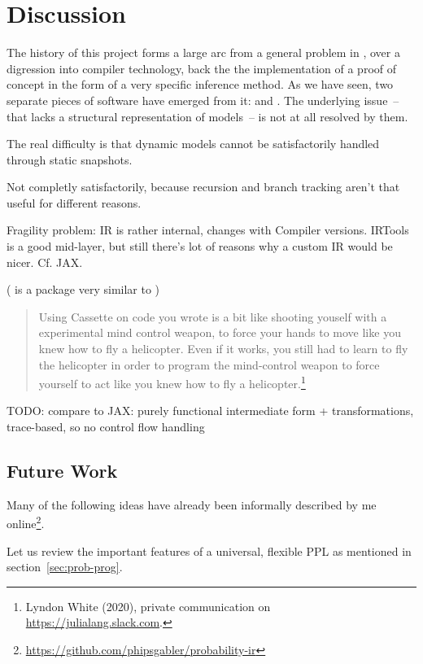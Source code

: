 \chapter{Discussion}
\label{cha:discussion}

The history of this project forms a large arc from a general problem in \turingjl{}, over a
digression into compiler technology, back the the implementation of a proof of concept in the form
of a very specific inference method.  As we have seen, two separate pieces of software have emerged
from it: \irtrackerjl{} and \autogibbsjl{}.  The underlying issue~-- that \turingjl{} lacks a
structural representation of models~-- is not at all resolved by them.

The real difficulty is that dynamic models cannot be satisfactorily handled through static
snapshots. 

Not completly satisfactorily, because recursion and branch tracking aren't that useful for different
reasons.

Fragility problem: IR is rather internal, changes with Compiler versions.  IRTools is a good
mid-layer, but still there's lot of reasons why a custom IR would be nicer. Cf. JAX.

( is a package very similar to )
\begin{quote}
  Using Cassette on code you wrote is a bit like shooting youself with a experimental mind control
  weapon, to force your hands to move like you knew how to fly a helicopter. Even if it works, you
  still had to learn to fly the helicopter in order to program the mind-control weapon to force
  yourself to act like you knew how to fly a helicopter.\footnote{Lyndon White (2020), private
    communication on \protect\url{https://julialang.slack.com}.}
\end{quote}


TODO: compare to JAX: purely functional intermediate form + transformations, trace-based, so no
control flow handling

\section{Future Work}
\label{sec:future-work}

Many of the following ideas have already been informally described by me
online\footnote{\protect\url{https://github.com/phipsgabler/probability-ir}}.

Let us review the important features of a universal, flexible PPL as mentioned in
section~\ref{sec:prob-prog}.

